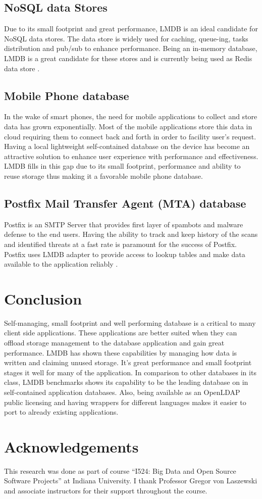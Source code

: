 \documentclass[9pt,twocolumn,twoside]{styles/osajnl}
\begin{document}
\subsection{NoSQL data Stores}

Due to its small footprint and great performance, LMDB is an ideal
candidate for NoSQL data stores. The data store is widely used for
caching, queue-ing, tasks distribution and pub/sub to enhance
performance. Being an in-memory database, LMDB is a great candidate
for these stores and is currently being used as Redis data store
\cite{www-kyoto}.

\subsection{Mobile Phone database}

In the wake of smart phones, the need for mobile
applications to collect and store data has grown exponentially. Most
of the mobile applications store this data in cloud requiring them to
connect back and forth in order to facility user’s request. Having a
local lightweight self-contained database on the device has become an
attractive solution to enhance user experience with performance and
effectiveness. LMDB fills in this gap due to its small footprint,
performance and ability to reuse storage thus making it a favorable
mobile phone database.

\subsection{Postfix Mail Transfer Agent (MTA) database}

Postfix is an SMTP Server that provides first layer of spambots and
malware defense to the end users. Having the ability to track and keep
history of the scans and identified threats at a fast rate is
paramount for the success of Postfix. Postfix uses LMDB adapter to
provide access to lookup tables and make data available to the
application reliably \cite{www-postfix}.

\section{Conclusion}

Self-managing, small footprint and well performing database is a
critical to many client side applications.  These applications are
better suited when they can offload storage management to the database
application and gain great performance. LMDB has shown these
capabilities by managing how data is written and claiming unused
storage. It’s great performance and small footprint stages it well for
many of the application. In comparison to other databases in its
class, LMDB benchmarks \cite{www-benchmark} shows its capability to be
the leading database on in self-contained application databases. Also,
being available as an OpenLDAP public licensing and having wrappers
for different languages makes it easier to port to already existing
applications.

\section*{Acknowledgements}
This research was done as part of course “I524: Big Data and Open
Source Software Projects” at Indiana University. I thank Professor
Gregor von Laszewski and associate instructors for their support
throughout the course.



 
\end{document}

